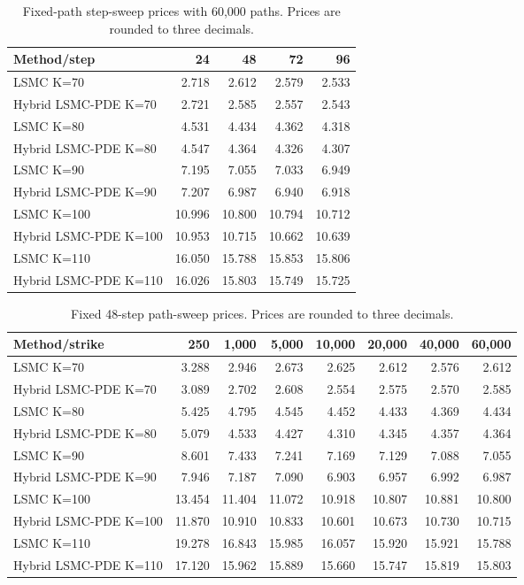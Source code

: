 \begin{table}[htbp]\centering
\caption{Fixed-path step-sweep prices with 60,000 paths. Prices are rounded to three decimals.}
\begin{tabular}{lrrrr}
\toprule
Method/step & 24 & 48 & 72 & 96 \\
\midrule
LSMC K=70 & 2.718 & 2.612 & 2.579 & 2.533 \\
Hybrid LSMC-PDE K=70 & 2.721 & 2.585 & 2.557 & 2.543 \\
LSMC K=80 & 4.531 & 4.434 & 4.362 & 4.318 \\
Hybrid LSMC-PDE K=80 & 4.547 & 4.364 & 4.326 & 4.307 \\
LSMC K=90 & 7.195 & 7.055 & 7.033 & 6.949 \\
Hybrid LSMC-PDE K=90 & 7.207 & 6.987 & 6.940 & 6.918 \\
LSMC K=100 & 10.996 & 10.800 & 10.794 & 10.712 \\
Hybrid LSMC-PDE K=100 & 10.953 & 10.715 & 10.662 & 10.639 \\
LSMC K=110 & 16.050 & 15.788 & 15.853 & 15.806 \\
Hybrid LSMC-PDE K=110 & 16.026 & 15.803 & 15.749 & 15.725 \\
\bottomrule
\end{tabular}
\end{table}

\begin{table}[htbp]\centering
\caption{Fixed 48-step path-sweep prices. Prices are rounded to three decimals.}
\begin{tabular}{lrrrrrrr}
\toprule
Method/strike & 250 & 1,000 & 5,000 & 10,000 & 20,000 & 40,000 & 60,000 \\
\midrule
LSMC K=70 & 3.288 & 2.946 & 2.673 & 2.625 & 2.612 & 2.576 & 2.612 \\
Hybrid LSMC-PDE K=70 & 3.089 & 2.702 & 2.608 & 2.554 & 2.575 & 2.570 & 2.585 \\
LSMC K=80 & 5.425 & 4.795 & 4.545 & 4.452 & 4.433 & 4.369 & 4.434 \\
Hybrid LSMC-PDE K=80 & 5.079 & 4.533 & 4.427 & 4.310 & 4.345 & 4.357 & 4.364 \\
LSMC K=90 & 8.601 & 7.433 & 7.241 & 7.169 & 7.129 & 7.088 & 7.055 \\
Hybrid LSMC-PDE K=90 & 7.946 & 7.187 & 7.090 & 6.903 & 6.957 & 6.992 & 6.987 \\
LSMC K=100 & 13.454 & 11.404 & 11.072 & 10.918 & 10.807 & 10.881 & 10.800 \\
Hybrid LSMC-PDE K=100 & 11.870 & 10.910 & 10.833 & 10.601 & 10.673 & 10.730 & 10.715 \\
LSMC K=110 & 19.278 & 16.843 & 15.985 & 16.057 & 15.920 & 15.921 & 15.788 \\
Hybrid LSMC-PDE K=110 & 17.120 & 15.962 & 15.889 & 15.660 & 15.747 & 15.819 & 15.803 \\
\bottomrule
\end{tabular}
\end{table}

